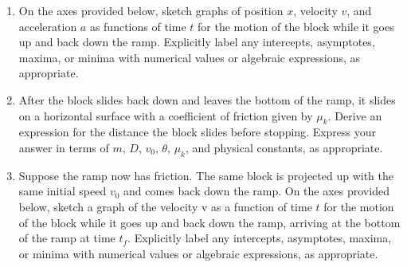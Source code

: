 \documentclass{../../../oss-classkick}
\begin{document}
\begin{enumerate}[leftmargin=15pt]
\begin{enumerate}[leftmargin=15pt]
  \item On the axes provided below, sketch graphs of position $x$, velocity
    $v$, and acceleration $a$ as functions of time $t$ for the motion of the
    block while it goes up and back down the ramp. Explicitly label any
    intercepts, asymptotes, maxima, or minima with numerical values or
    algebraic expressions, as appropriate.
    \begin{center}
      \hspace{.3in}
      \hspace{.3in}
    \end{center}
  \item After the block slides back down and leaves the bottom of the ramp, it
    slides on a horizontal surface with a coefficient of friction given by
    $\mu_k$. Derive an expression for the distance the block slides before
    stopping. Express your answer in terms of $m$, $D$, $v_0$, $\theta$,
    $\mu_k$, and physical constants, as appropriate.
    \vspace{1in}

  \item Suppose the ramp now has friction. The same block is projected up with
    the same initial speed $v_0$ and comes back down the ramp. On the axes
    provided below, sketch a graph of the velocity v as a function of time $t$
    for the motion of the block while it goes up and back down the ramp,
    arriving at the bottom of the ramp at time $t_f$. Explicitly label any
    intercepts, asymptotes, maxima, or minima with numerical values or
    algebraic expressions, as appropriate.
    

\end{enumerate}
\end{enumerate}
\end{document}
